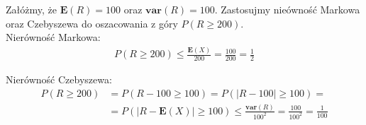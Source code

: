 \documentclass{article}
\begin{document}
Załóżmy, że $\mathbf{E}(R) = 100$ oraz $\mathbf{var}(R) = 100$. 
Zastosujmy nieówność Markowa oraz Czebyszewa do oszacowania z góry $P(R\geq 200)$.\\

\noindent
Nierówność Markowa:
\setcounter{equation}{0}
\begin{align}
    P(R\geq 200) \leq \frac{\mathbf{E}(X)}{200} = \frac{100}{200} = \frac{1}{2}
\end{align}

\noindent
Nierówność Czebyszewa:
\begin{align}
    P(R\geq 200) &= P(R - 100\geq 100) = P(|R-100|\geq 100) =\\
    &= P(|R-\mathbf{E}(X)| \geq 100) \leq \frac{\mathbf{var}(R)}{100^2}
    = \frac{100}{100^2} = \frac{1}{100}
\end{align}
\end{document}

